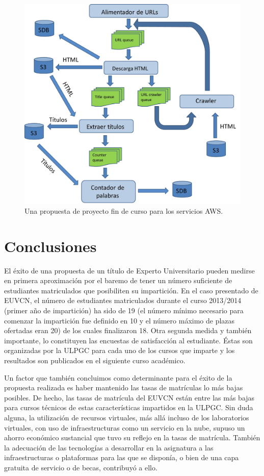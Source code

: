 \documentclass[conference]{IEEEtran}
\begin{document}
\begin{figure}[!t]
\centering
\includegraphics[width=\columnwidth]{Homework_sqs_sdb.jpeg}
\caption{Una propuesta de proyecto fin de curso para los servicios AWS.}
\label{fig:trabajo}
\end{figure}

\section{Conclusiones \label{sec:conclusiones}}

El éxito de una propuesta de un título de Experto Universitario pueden medirse
en primera aproximación por el baremo de tener un número suficiente de
estudiantes matriculados que posibiliten su impartición. En el caso presentado
de EUVCN, el número de estudiantes matriculados durante el curso 2013/2014
(primer año de impartición) ha sido  de 19 (el número mínimo necesario para
comenzar la impartición fue definido en
10 y  el número máximo de plazas ofertadas eran 20) de los cuales finalizaron
18. Otra
segunda medida y también importante, lo constituyen las encuestas de
satisfacción al estudiante. Éstas son organizadas por la ULPGC para cada uno de los cursos que imparte y los resultados son publicados en el siguiente curso académico.

Un factor que también concluimos como determinante para el éxito de la
propuesta realizada es haber mantenido las tasas de matrículas lo más bajas
posibles. De hecho, las tasas de matrícula del EUVCN están entre las más bajas
para cursos técnicos de estas características impartidos en la ULPGC. Sin duda
alguna, la utilización de recursos virtuales, más allá incluso de los
laboratorios virtuales, con uso de infraestructuras como un servicio en la
nube, supuso un ahorro económico sustancial que tuvo su reflejo en la tasas de
matrícula. También la adecuación de las tecnologías a desarrollar en la asignatura a
las infraestructuras o plataformas para las que se disponía, o bien de una
capa gratuita de servicio o de becas, contribuyó a ello.
\end{document}
